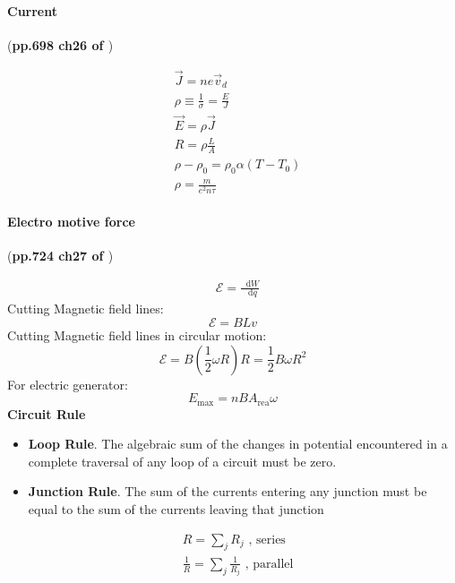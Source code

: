 \documentclass{article}
\newcommand*\diff{\mathop{}\!\mathrm{d}}
\numberwithin{equation}{subsection} %
\theoremstyle{definition}
\begin{document}
\paragraph{Current} (\textbf{pp.698 ch26 of \cite{book}})

\begin{align}
    & \vec{J} = ne \vec{v}_d \\
    & \rho \equiv \frac{1}{\sigma} = \frac{E}{J} \\
    & \vec{E} = \rho \vec{J} \\
    & R = \rho \frac{L}{A} \\
    & \rho - \rho_0 = \rho_0 \alpha (T-T_0) \\
    & \rho = \frac{m}{e^2 n\tau }
\end{align}

\paragraph{Electro motive force} (\textbf{pp.724 ch27 of \cite{book}})

\begin{align}
    & \mathcal{E} = \frac{\diff W}{\diff q}
\end{align}
Cutting Magnetic field lines:
\begin{equation}
    \mathcal{E} = BLv 
\end{equation}
Cutting Magnetic field lines in circular motion:
\begin{equation}
    \mathcal{E} = B(\frac{1}{2}\omega R) R = \frac{1}{2}B\omega R^2
\end{equation}
For electric generator:
\begin{equation}
    E_\text{max} = nBA_\text{rea}\omega
\end{equation}
\textbf{Circuit Rule}
\begin{itemize}
    \item \textbf{Loop Rule}. The algebraic sum of the changes in
        potential encountered in a complete traversal of any loop of a
        circuit must be zero.
    \item \textbf{Junction Rule}. The sum of the currents entering any
        junction must be equal to the sum of the currents leaving that
        junction
\end{itemize}

\begin{align}
    & R = \sum_j R_j \text{ , series} \\
    & \frac{1}{R} = \sum_j \frac{1}{R_j} \text{ , parallel}
\end{align}
\end{document}
